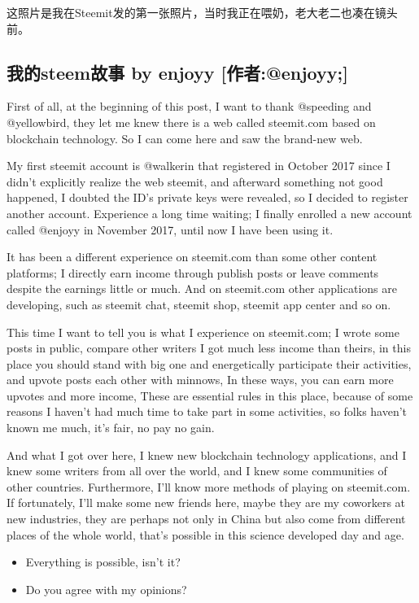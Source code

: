 \documentclass[]{ctexbook}
\providecommand{\tightlist}{%
  \setlength{\itemsep}{0pt}\setlength{\parskip}{0pt}}
\begin{document}
这照片是我在Steemit发的第一张照片，当时我正在喂奶，老大老二也凑在镜头前。

\hypertarget{steem-by-enjoyy-enjoyy}{%
\subsection{我的steem故事 by enjoyy {[}作者:@enjoyy;{]}}\label{steem-by-enjoyy-enjoyy}}

First of all, at the beginning of this post, I want to thank @speeding and @yellowbird,
they let me knew there is a web called steemit.com based on blockchain technology.
So I can come here and saw the brand-new web.

My first steemit account is @walkerin that registered in October 2017 since I didn't explicitly realize the web steemit, and afterward something not good happened, I doubted the ID's private keys were revealed, so I decided to register another account. Experience a long time waiting; I finally enrolled a new account called @enjoyy in November 2017, until now I have been using it.

It has been a different experience on steemit.com than some other content platforms; I directly earn income through publish posts or leave comments despite the earnings little or much. And on steemit.com other applications are developing, such as steemit chat, steemit shop, steemit app center and so on.

This time I want to tell you is what I experience on steemit.com; I wrote some posts in public, compare other writers I got much less income than theirs, in this place you should stand with big one and energetically participate their activities, and upvote posts each other with minnows,
In these ways, you can earn more upvotes and more income,
These are essential rules in this place, because of some reasons I haven't had much time to take part in some activities, so folks haven't known me much, it's fair, no pay no gain.

And what I got over here, I knew new blockchain technology applications, and I knew some writers from all over the world, and I knew some communities of other countries. Furthermore, I'll know more methods of playing on steemit.com.
If fortunately, I'll make some new friends here, maybe they are my coworkers at new industries, they are perhaps not only in China but also come from different places of the whole world, that's possible in this science developed day and age.

\begin{itemize}
\tightlist
\item
  Everything is possible, isn't it?
\item
  Do you agree with my opinions?
\end{itemize}
\end{document}
